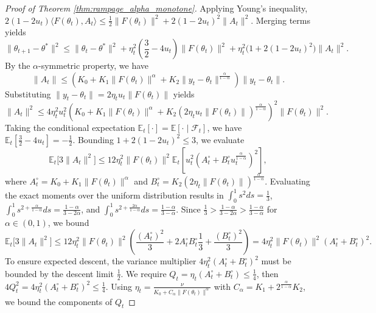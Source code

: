 \documentclass[letter,11pt]{article}
\begin{document}
\begin{proof}[Proof of Theorem \ref{thm:rampage_alpha_monotone}]
Applying Young's inequality, $2(1 - 2u_t)\langle F(\theta_t), A_t \rangle \le \frac{1}{2}\|F(\theta_t)\|^2 + 2(1 - 2u_t)^2\|A_t\|^2$. Merging terms yields
\begin{equation} \label{eq:rampage_alpha_variance_isolated}
\|\theta_{t+1} - \theta^*\|^2 \le \|\theta_t - \theta^*\|^2 + \eta_t^2\left(\frac{3}{2} - 4u_t\right)\|F(\theta_t)\|^2 + \eta_t^2\big(1 + 2(1 - 2u_t)^2\big)\|A_t\|^2.
\end{equation}
By the $\alpha$-symmetric property, we have
\begin{equation}
\|A_t\| \le \left( K_0 + K_1 \|F(\theta_t)\|^\alpha + K_2 \|y_t - \theta_t\|^{\frac{\alpha}{1-\alpha}} \right) \|y_t - \theta_t\|.
\end{equation}
Substituting $\|y_t - \theta_t\| = 2\eta_t u_t \|F(\theta_t)\|$ yields
\begin{equation} \label{eq:rampage_alpha_lipschitz_exact}
\|A_t\|^2 \le 4\eta_t^2 u_t^2 \left( K_0 + K_1 \|F(\theta_t)\|^\alpha + K_2 (2\eta_t u_t \|F(\theta_t)\|)^{\frac{\alpha}{1-\alpha}} \right)^2 \|F(\theta_t)\|^2.
\end{equation}
Taking the conditional expectation $\mathbb{E}_t[\cdot] = \mathbb{E}[\cdot \mid \mathcal{F}_t]$, we have $\mathbb{E}_t\left[\frac{3}{2} - 4u_t\right] = -\frac{1}{2}$. Bounding $1 + 2(1 - 2u_t)^2 \le 3$, we evaluate
\begin{equation}
\mathbb{E}_t\big[3 \|A_t\|^2\big] \le 12\eta_t^2 \|F(\theta_t)\|^2 \mathbb{E}_t\left[ u_t^2 \left( A_t^\circ + B_t^\circ u_t^{\frac{\alpha}{1-\alpha}} \right)^2 \right],
\end{equation}
where $A_t^\circ = K_0 + K_1\|F(\theta_t)\|^\alpha$ and $B_t^\circ = K_2 (2\eta_t\|F(\theta_t)\|)^{\frac{\alpha}{1-\alpha}}$. Evaluating the exact moments over the uniform distribution results in $\int_0^1 s^2 ds = \frac{1}{3}$, $\int_0^1 s^{2 + \frac{\alpha}{1-\alpha}} ds = \frac{1-\alpha}{3-2\alpha}$, and $\int_0^1 s^{2 + \frac{2\alpha}{1-\alpha}} ds = \frac{1-\alpha}{3-\alpha}$. Since $\frac{1}{3} > \frac{1-\alpha}{3-2\alpha} > \frac{1-\alpha}{3-\alpha}$ for $\alpha \in (0, 1)$, we bound
\begin{equation}
\mathbb{E}_t\big[3 \|A_t\|^2\big] \le 12\eta_t^2 \|F(\theta_t)\|^2 \left( \frac{(A_t^\circ)^2}{3} + 2A_t^\circ B_t^\circ \frac{1}{3} + \frac{(B_t^\circ)^2}{3} \right) = 4\eta_t^2 \|F(\theta_t)\|^2 (A_t^\circ + B_t^\circ)^2.
\end{equation}
To ensure expected descent, the variance multiplier $4\eta_t^2(A_t^\circ + B_t^\circ)^2$ must be bounded by the descent limit $\frac{1}{2}$. We require $Q_t = \eta_t(A_t^\circ + B_t^\circ) \le \frac{1}{4}$, then $4Q_t^2 = 4 \eta_t^2(A_t^\circ + B_t^\circ)^2 \leq \frac{1}{4}$. Using $\eta_t = \frac{\nu}{K_0 + C_\alpha \|F(\theta_t)\|^\alpha}$ with $C_\alpha = K_1 + 2^{\frac{\alpha}{1-\alpha}} K_2$, we bound the components of $Q_t$

\end{proof}
\end{document}

